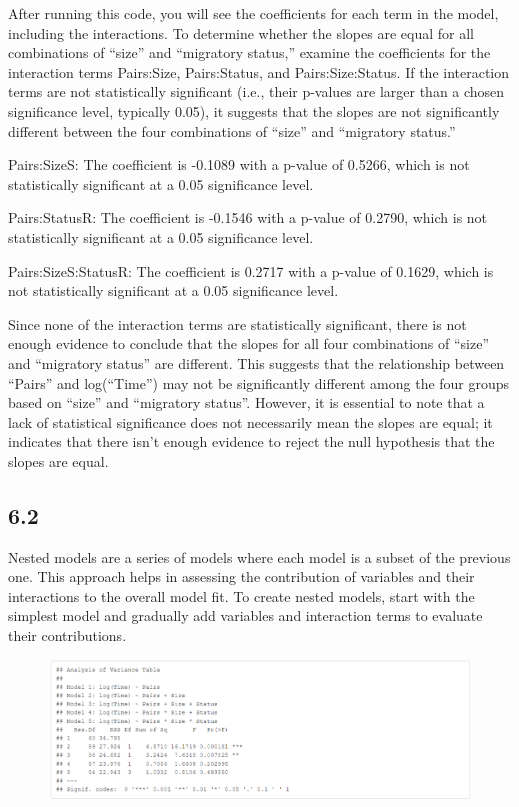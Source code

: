 \documentclass{article}
\begin{document}
After running this code, you will see the coefficients for each term in the model, including the interactions. To determine whether the slopes are equal for all combinations of “size” and “migratory status,” examine the coefficients for the interaction terms Pairs:Size, Pairs:Status, and Pairs:Size:Status. If the interaction terms are not statistically significant (i.e., their p-values are larger than a chosen significance level, typically 0.05), it suggests that the slopes are not significantly different between the four combinations of “size” and “migratory status.”

Pairs:SizeS: The coefficient is -0.1089 with a p-value of 0.5266, which is not statistically significant at a 0.05 significance level.

Pairs:StatusR: The coefficient is -0.1546 with a p-value of 0.2790, which is not statistically significant at a 0.05 significance level.

Pairs:SizeS:StatusR: The coefficient is 0.2717 with a p-value of 0.1629, which is not statistically significant at a 0.05 significance level.

Since none of the interaction terms are statistically significant, there is not enough evidence to conclude that the slopes for all four combinations of “size” and “migratory status” are different. This suggests that the relationship between “Pairs” and log(“Time”) may not be significantly different among the four groups based on “size” and “migratory status”. However, it is essential to note that a lack of statistical significance does not necessarily mean the slopes are equal; it indicates that there isn’t enough evidence to reject the null hypothesis that the slopes are equal.

\subsection*{6.2}
Nested models are a series of models where each model is a subset of the previous one. This approach helps in assessing the contribution of variables and their interactions to the overall model fit. To create nested models, start with the simplest model and gradually add variables and interaction terms to evaluate their contributions.

\begin{figure}
    \includegraphics[width=\linewidth]{tables/variance-table.png}
\end{figure}
\end{document}
